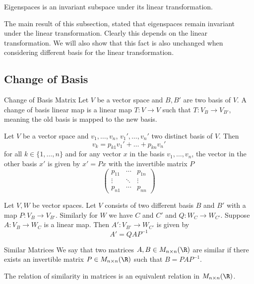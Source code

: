 \begin{thm}{}{} Eigenspaces is an invariant subspace under its linear transformation. 
\end{thm}

The main result of this subsection, stated that eigenspaces remain invariant under the linear transformation. Clearly this depends on the linear transformation. We will also show that this fact is also unchanged when considering different basis for the linear transformation. 

\subsection{Change of Basis}
\begin{defn}{Change of Basis Matrix}{} Let $V$ be a vector space and $B,B'$ are two basis of $V$. A change of basis linear map is a linear map $T:V\to V$ such that $T:V_B\to V_{B'}$, meaning the old basis is mapped to the new basis. 
\end{defn}

\begin{prp}{}{} Let $V$ be a vector space and $v_1,\dots,v_n$, $v_1',\dots,v_n'$ two distinct basis of $V$. Then $$v_k=p_{k1}v_1'+\dots+p_{kn}v_n'$$ for all $k\in\{1,\dots,n\}$ and for any vector $x$ in the basis $v_1,\dots,v_n$, the vector in the other basis $x'$ is given by $x'=Px$ with the invertible matrix $P$ $$\begin{pmatrix}
p_{11}&\cdots&p_{1n}\\
\vdots&\ddots&\vdots\\
p_{n1}&\cdots&p_{nn}
\end{pmatrix}$$
\end{prp}

\begin{thm}{}{} Let $V,W$ be vector spaces. Let $V$ consists of two different basis $B$ and $B'$ with a map $P:V_B\to V_{B'}$. Similarly for $W$ we have $C$ and $C'$ and $Q:W_C\to W_{C'}$. Suppose $A:V_B\to W_C$ is a linear map. Then $A':V_{B'}\to W_{C'}$ is given by $$A'=QAP^{-1}$$
\end{thm}

\begin{defn}{Similar Matrices}{} We say that two matrices $A,B\in M_{n\times n}(\R)$ are similar if there exists an invertible matrix $P\in M_{n\times n}(\R)$ such that $B=PAP^{-1}$. 
\end{defn}

\begin{lmm}{}{} The relation of similarity in matrices is an equivalent relation in $M_{n\times n}(\R)$. 
\end{lmm}

